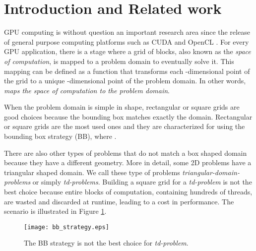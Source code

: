 \documentclass[conference]{IEEEtran}
\begin{document}
\IEEEpeerreviewmaketitle

\section{Introduction and Related work}
\label{sec_introduction}
GPU computing is without question an important research area \cite{citeulike:2767438, Nickolls:2010:GCE:1803935.1804055} since the release 
of general purpose computing platforms such as CUDA \cite{nvidia_cuda_guide} and OpenCL \cite{opencl08}. 
For every GPU application, there is a stage where a grid of blocks, also known as the \textit{space of computation}, 
is mapped to a problem domain to eventually solve it.
This mapping can be defined as a function  that transforms each -dimensional point 
 of the grid to a unique -dimensional point of the problem domain. 
In other words,  \textit{maps the space of computation to the problem domain}. 

When the problem domain is simple in shape, rectangular or square grids are good choices because the bounding box matches exactly the domain. 
Rectangular or square grids are the most used ones and they are characterized for using the bounding box strategy (BB), where .

There are also other types of problems that do not match a box shaped domain because they have a different geometry. 
More in detail, some 2D problems have a triangular shaped domain. We call these type of problems \textit{triangular-domain-problems} 
or simply \textit{td-problems}. Building a square grid for a \textit{td-problem} is not the best choice 
because entire blocks of computation, containing hundreds of threads, are wasted and discarded at runtime, leading to a cost in 
performance. The scenario is illustrated in Figure \ref{fig_bb_strategy}.
\begin{figure}[ht!]
\centering
\texttt{[image: bb\_strategy.eps]}
\caption{The BB strategy is not the best choice for \textit{td-problem}.}
\label{fig_bb_strategy}
\end{figure}
\end{document}
